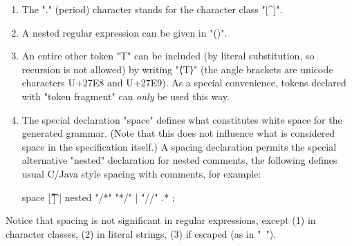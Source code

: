 \documentclass[11pt]{article} %
\begin{document}
\begin{manual}
\begin{enumerate}
  \item The "." (period) character stands for the character class "[^\n]".

  \item A nested regular expression can be given in "()".

  \item An entire other token "T" can be included (by literal substitution, so recursion is not
    allowed) by writing "⟨T⟩" (the angle brackets are unicode characters U+27E8 and U+27E9). As a
    special convenience, tokens declared with "token fragment" can \emph{only} be used this way.

  \item The special declaration "space" defines what constitutes white space for the generated
    grammar. (Note that this does not influence what is considered space in the specification
    itself.) A spacing declaration permits the special alternative "nested" declaration for nested
    comments, the following defines usual C/Java style spacing with comments, for example:
\begin{code}[]
space [ \t\f\r\n] | nested "/*" "*/" | "//" .* ;
\end{code}

  \end{enumerate}
  Notice that spacing is not significant in regular expressions, except (1) in character classes,
  (2) in literal strings, (3) if escaped (as in "\ ").
\end{manual}
\end{document}
